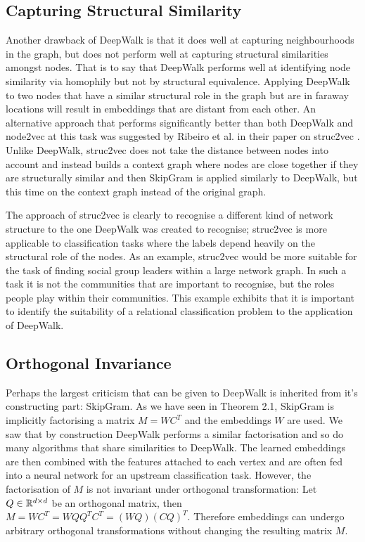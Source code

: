 \documentclass[a4paper]{article}
\begin{document}
\subsection{Capturing Structural Similarity}
Another drawback of DeepWalk is that it does well at capturing neighbourhoods in the graph, but does not perform well
at capturing structural similarities amongst nodes. That is to say that DeepWalk
performs well at identifying node similarity via homophily but not by structural equivalence. Applying DeepWalk to two nodes
that have a similar structural role in the graph but are in faraway locations
will result in embeddings that are distant from each other. An alternative
approach that performs significantly better than both DeepWalk and node2vec at this task was suggested by
Ribeiro et al. in their paper on struc2vec \cite{ribeiro2017}. Unlike DeepWalk, struc2vec does not
take the distance between nodes into account and instead builds a context graph
where nodes are close together if they are structurally similar and then
SkipGram is applied similarly to DeepWalk, but this time on the
context graph instead of the original graph.

The approach of struc2vec is clearly to recognise a different kind of network
structure to the one DeepWalk was created to recognise; struc2vec is more
applicable to classification tasks where the labels depend heavily on the
structural role of the nodes. As an example, struc2vec would be more suitable
for the task of finding social group leaders within a large network
graph. In such a task it is not the communities that are important to recognise,
but the roles people play within their communities. This example exhibits that it is
important to identify the suitability of a relational classification problem to
the application of DeepWalk.
\subsection{Orthogonal Invariance}
Perhaps the largest criticism that can be given to DeepWalk is inherited from it's constructing part: SkipGram. As we have
seen in Theorem 2.1, SkipGram is implicitly factorising a matrix $M = WC^T$ and the embeddings $W$ are used. We saw that
by construction DeepWalk performs a similar factorisation and so do many algorithms that share similarities to DeepWalk. The
learned embeddings are then combined with the features attached to each vertex and are often fed into a neural network for an
upstream classification task. However, the factorisation of $M$ is not invariant under orthogonal transformation: Let $Q \in \R^{d \times d}$
be an orthogonal matrix, then $M = WC^T = WQQ^TC^T = (WQ)(CQ)^T$. Therefore embeddings can undergo arbitrary orthogonal transformations
without changing the resulting matrix $M$.
\end{document}
